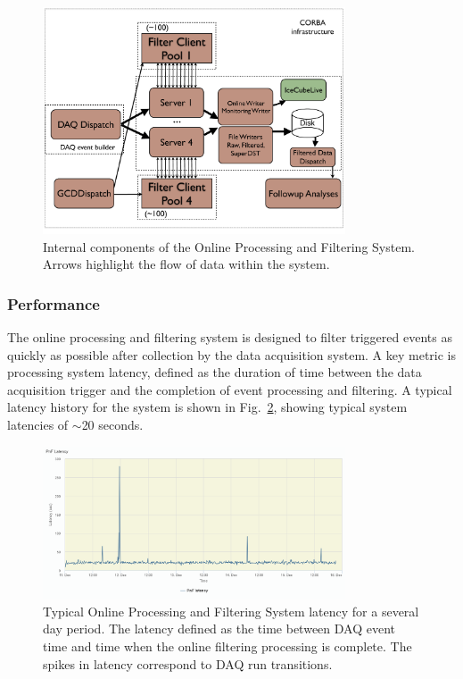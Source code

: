 \begin{figure}[!h]
 \centering
 \includegraphics[width=0.8\textwidth]{graphics/online/pnf/PnF_Internals.pdf}
 \caption{Internal components of the Online Processing and Filtering System.  Arrows highlight the flow of data within the system.}
 \label{fig:online_pnf_internals}
\end{figure}

\subsubsection{Performance}
The online processing and filtering system is designed to filter triggered events as quickly as possible after collection by
the data acquisition system.   A key metric is processing system latency, defined as the duration of time between the data acquisition trigger
and the completion of event processing and filtering.  A typical latency history for the system is shown in Fig.~\ref{fig:online_pnf_latency}, showing
typical system latencies of $\sim$20 seconds.

\begin{figure}[!h]
 \centering
 \includegraphics[width=0.8\textwidth]{graphics/online/pnf/pnf_latency.png}
 \caption{Typical Online Processing and Filtering System latency for a several day period.  The latency defined as the time between DAQ event time and time when the
 online filtering processing is complete.  The spikes in latency correspond to DAQ run transitions.}
 \label{fig:online_pnf_latency}
\end{figure}

